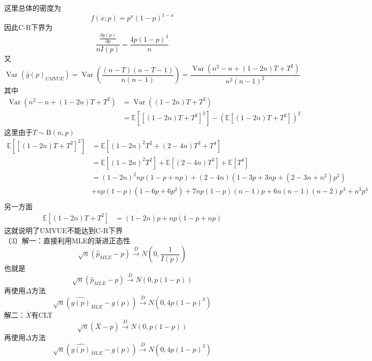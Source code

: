 \documentclass[UTF8,openany]{book}
\begin{document}
	这里总体的密度为
	\[
	f(x ; p)=p^x(1-p)^{1-x}
	\]
	因此C-R下界为
	\[
	\frac{\frac{\partial g(p)}{\partial p}}{n I(p)}=\frac{4 p(1-p)^3}{n}
	\]
	又
	\[
	\operatorname{Var}(\hat{g}(p)_{UMVUE} )=\operatorname{Var}\left(\frac{(n-T)(n-T-1)}{n(n-1)}\right) =\frac{\operatorname{Var}\left(n^2-n+(1-2n)T+T^2\right)}{n^2(n-1)^2}
	\]
	其中
	\begin{align*}
		\operatorname{Var}\left(n^2-n+(1-2n)T+T^2\right) & =\operatorname{Var}\left((1-2n)T+T^2\right) \\
		& =\mathbb{E}\left[\left[(1-2 n) T+T^2\right]^2\right]-\left(\mathbb{E}\left[(1-2 n) T+T^2\right]\right)^2
	\end{align*}
	这里由于$T\sim \mathrm{B}(n,p)$
	\begin{align*}
		\mathbb{E}\left[\left[(1-2 n) T+T^2\right]^2\right] & =\mathbb{E}\left[(1-2n)^2 T^2 +(2-4n)T^3+T^4 \right]  \\
		& =\mathbb{E}\left[(1-2n)^2 T^2 \right] +\mathbb{E}\left[(2-4n)T^3 \right] +\mathbb{E}\left[T^4 \right] \\
		&=(1-2n)^2 np(1-p+np)+(2-4n)(1-3p+3np+(2-3n+n^2)p^2)\\
		&+np(1-p)(1-6p+6p^2)+7np(1-p)(n-1)p+6n(n-1)(n-2)p^3+n^3p^4\\
	\end{align*}
	另一方面
	\begin{align*}
		\mathbb{E}\left[(1-2 n) T+T^2\right] & =(1-2n)p+np(1-p+np) 
	\end{align*}
	这就说明了UMVUE不能达到C-R下界\\
	（3）解一：直接利用MLE的渐进正态性
	\[
	\sqrt{n}\left(\hat{p}_{MLE}-p \right)\xrightarrow{D} N \left(0,\frac{1}{I(p)} \right) 
	\]
	也就是
	\[
	\sqrt{n}\left(\hat{p}_{MLE}-p \right)\xrightarrow{D} N \left(0,p(1-p) \right) 
	\]
	再使用$\Delta$方法
	\[
	\sqrt{n}\left(\hat{g(p)}_{MLE}-g(p) \right)\xrightarrow{D} N \left(0,4p(1-p)^3 \right) 
	\]
	解二：$\overline{X}$有CLT
	\[
	\sqrt{n}\left(\overline{X}-p \right)\xrightarrow{D} N \left(0,p(1-p) \right) 
	\]
	再使用$\Delta$方法
	\[
	\sqrt{n}\left(\hat{g(p)}_{MLE}-g(p) \right)\xrightarrow{D} N \left(0,4p(1-p)^3 \right) 
	\]\\
	
	
	
\end{document}
